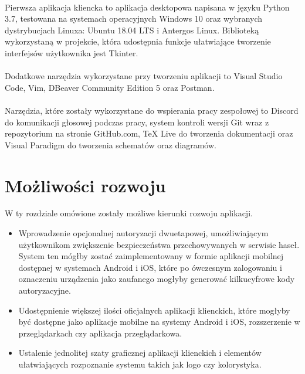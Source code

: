 \documentclass{article}
\begin{document}
	\paragraph*{} Pierwsza aplikacja kliencka to aplikacja desktopowa napisana w języku Python 3.7, testowana na systemach operacyjnych Windows 10 oraz wybranych dystrybucjach Linuxa: Ubuntu 18.04 LTS i Antergos Linux. Biblioteką wykorzystaną w projekcie, która udostępnia funkcje ułatwiające tworzenie interfejsów użytkownika jest Tkinter.
	\paragraph*{} Dodatkowe narzędzia wykorzystane przy tworzeniu aplikacji to Visual Studio Code, Vim, DBeaver Community Edition 5 oraz Postman.
	\paragraph*{} Narzędzia, które zostały wykorzystane do wspierania pracy zespołowej to Discord do komunikacji głosowej podczas pracy, system kontroli wersji Git wraz z repozytorium na stronie GitHub.com, TeX Live do tworzenia dokumentacji oraz Visual Paradigm do tworzenia schematów oraz diagramów.

    \section{Możliwości rozwoju}
    W ty rozdziale omówione zostały możliwe kierunki rozwoju aplikacji.

    \begin{itemize}
		\item Wprowadzenie opcjonalnej autoryzacji dwuetapowej, umożliwiającym użytkownikom zwiększenie bezpieczeństwa przechowywanych w serwisie haseł. System ten mógłby zostać zaimplementowany w formie aplikacji mobilnej dostępnej w systemach Android i iOS, które po ówczesnym zalogowaniu i oznaczeniu urządzenia jako zaufanego mogłyby generować kilkucyfrowe kody autoryzacyjne.
		\item Udostępnienie większej ilości oficjalnych aplikacji klienckich, które mogłyby być dostępne jako aplikacje mobilne na systemy Android i iOS, rozszerzenie w przeglądarkach czy aplikacja przeglądarkowa.
		\item Ustalenie jednolitej szaty graficznej aplikacji klienckich i elementów ułatwiających rozpoznanie systemu takich jak logo czy kolorystyka.
	\end{itemize}
\end{document}
